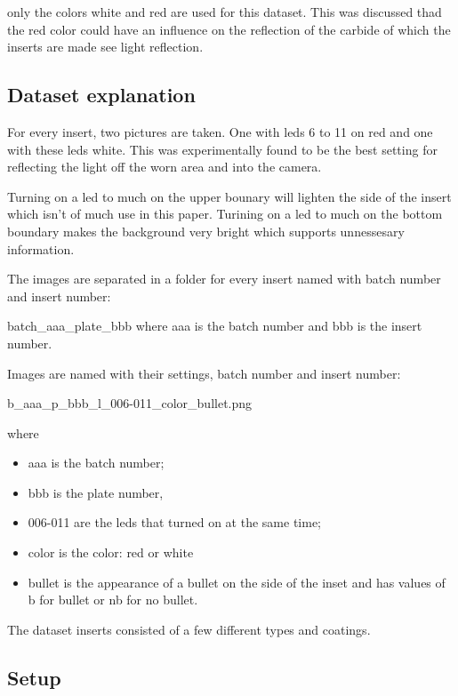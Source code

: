 only the colors white and red are used for this dataset. This was discussed thad the red color could have an influence on the reflection of the carbide of which the inserts are made see light reflection.



\subsection{Dataset explanation}

For every insert, two pictures are taken. One with leds 6 to 11 on red and one with these leds white. This was experimentally found to be the best setting for reflecting the light off the worn area and into the camera. 

Turning on a led to much on the upper bounary will lighten the side of the insert which isn't of much use in this paper. Turining on a led to much on the bottom boundary makes the background very bright which supports unnessesary information.



The images are separated in a folder for every insert named with batch number and insert number:

batch\_aaa\_plate\_bbb where aaa is the batch number and bbb is the insert number.

Images are named with their settings, batch number and insert number:

b\_aaa\_p\_bbb\_l\_006-011\_color\_bullet.png 

where 

\begin{itemize}
\item aaa is the batch number; 
\item bbb is the plate number, 
\item 006-011 are the leds that turned on at the same time; 
\item color is the color: red or white
\item bullet is the appearance of a bullet on the side of the inset and has values of b for bullet or nb for no bullet.
\end{itemize}


The dataset inserts consisted of a few different types and coatings. 



\subsection{Setup}

